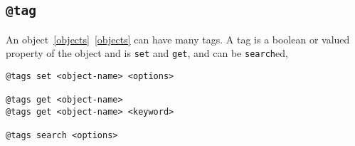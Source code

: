 \subsection{\texttt{@tag}}
\label{tag}

An object~\ref{objects}~\ref{objects} can have many tags. A tag is a boolean or valued property of the object and is \texttt{set} and \texttt{get}, and can be \texttt{search}ed,
%
\begin{verbatim}
@tags set <object-name> <options>

@tags get <object-name>
@tags get <object-name> <keyword>

@tags search <options>
\end{verbatim}
